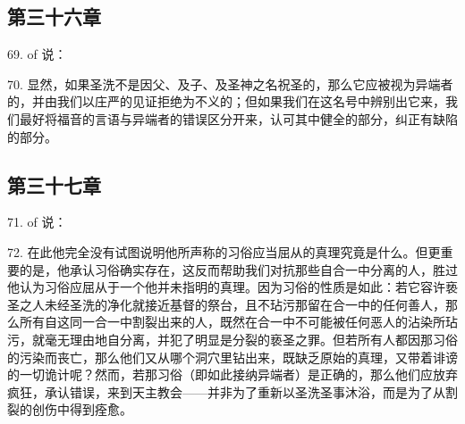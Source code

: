 
\subsection{第三十六章}

69.  of 说：\par

70. 显然，如果圣洗不是因父、及子、及圣神之名祝圣的，那么它应被视为异端者的，并由我们以庄严的见证拒绝为不义的；但如果我们在这名号中辨别出它来，我们最好将福音的言语与异端者的错误区分开来，认可其中健全的部分，纠正有缺陷的部分。\par


\subsection{第三十七章}

71.  of 说：\par

72. 在此他完全没有试图说明他所声称的习俗应当屈从的真理究竟是什么。但更重要的是，他承认习俗确实存在，这反而帮助我们对抗那些自合一中分离的人，胜过他认为习俗应屈从于一个他并未指明的真理。因为习俗的性质是如此：若它容许亵圣之人未经圣洗的净化就接近基督的祭台，且不玷污那留在合一中的任何善人，那么所有自这同一合一中割裂出来的人，既然在合一中不可能被任何恶人的沾染所玷污，就毫无理由地自分离，并犯了明显是分裂的亵圣之罪。但若所有人都因那习俗的污染而丧亡，那么他们又从哪个洞穴里钻出来，既缺乏原始的真理，又带着诽谤的一切诡计呢？然而，若那习俗（即如此接纳异端者）是正确的，那么他们应放弃疯狂，承认错误，来到天主教会——并非为了重新以圣洗圣事沐浴，而是为了从割裂的创伤中得到痊愈。\par

